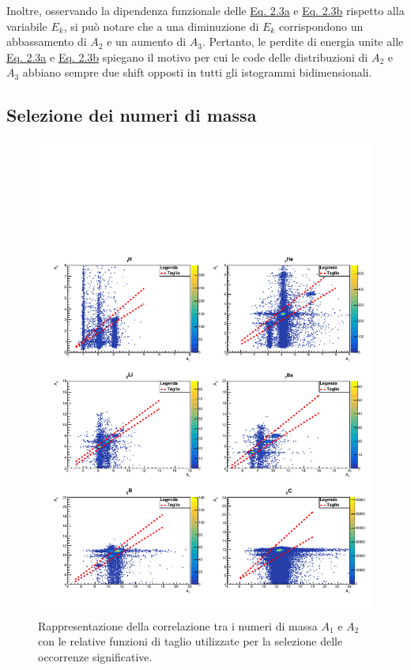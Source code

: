 \documentclass[12pt,a4paper,twoside]{report}
\begin{document}
	Inoltre, osservando la dipendenza funzionale delle \hyperref[eq:a1]{Eq. 2.3a} e \hyperref[eq:a2]{Eq. 2.3b} rispetto alla variabile $E_k$, si può notare che a una diminuzione di $E_k$ corrispondono un abbassamento di $A_2$ e un aumento di $A_3$. Pertanto, le perdite di energia unite alle \hyperref[eq:a1]{Eq. 2.3a} e \hyperref[eq:a2]{Eq. 2.3b} spiegano il motivo per cui le code delle distribuzioni di $A_2$ e $A_3$ abbiano sempre due shift opposti in tutti gli istogrammi bidimensionali.
	
	\subsection{Selezione dei numeri di massa}\label{sec:selection_number_of_mass}
	\begin{figure}[H]
		\centering
		\includegraphics[width=1.\linewidth]{c_MultiCanvasCut1.pdf}
		\caption{Rappresentazione della correlazione tra i numeri di massa $A_1$ e $A_2$ con le relative funzioni di taglio utilizzate per la selezione delle occorrenze significative.}
		\label{fig:a1_cut}
	\end{figure}
\end{document}
